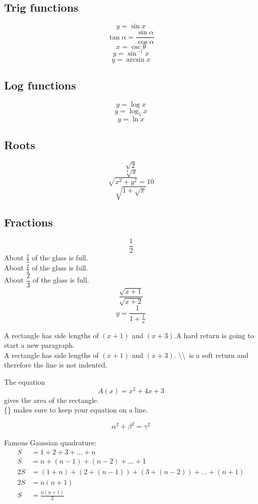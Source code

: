 \documentclass[12pt, a4paper]{article}
\begin{document}
\subsection{Trig functions}
$$y=\sin x$$
$$\tan \alpha=\frac{\sin \alpha}{\cos \alpha}$$
$$x=\csc \theta$$
$$y=\sin^{-1}x$$
$$y=\arcsin x$$

\subsection{Log functions}
$$y=\log x$$
$$y=\log_5  x$$
$$y=\ln x$$

\subsection{Roots}
$$\sqrt2$$
$$\sqrt[3]{x}$$
$$\sqrt{x^2+y^2}=10$$
$$\sqrt{  1+\sqrt{x}  }$$

\subsection{Fractions}
$$\frac{1}{2}$$
About $\displaystyle \frac{2}{3}$ of the glass is full.\\[12pt]
About $\frac{2}{3}$ of the glass is full.\\[6pt]
About $\dfrac{2}{3}$ of the glass is full.
$$\frac{\sqrt{x+1}}{\sqrt{x+2}}$$
$$y=\frac{1}{  1+\frac{1}{x}  }$$

A rectangle has side lengths of $(x+1)$ and $(x+3)$.A hard return is going to start a new paragraph.\\
A rectangle has side lengths of $(x+1)$ and $(x+3)$. \textbackslash\textbackslash\ is a soft return and therefore the line is not indented.

The equation $${A(x)=x^2+4x+3}$$ gives the area of the rectangle.\\
\{\} makes sure to keep your equation on a line.\cite{trevisanato2000tea}

\begin{equation}\label{eq0}
    \alpha^2+\beta^2=\gamma^2
\end{equation}

Famous Gaussian quadrature:
\begin{equation*}
    \begin{split}
        S&=1+2+3+\dots+n\\
        S&=n+(n-1)+(n-2)+\dots+1\\
        2S&=(1+n)+(2+(n-1))+(3+(n-2))+\dots+(n+1)\\
        2S&=n(n+1)\\
        S&=\frac{n(n+1)}{2} 
    \end{split}
\end{equation*}
\end{document}
